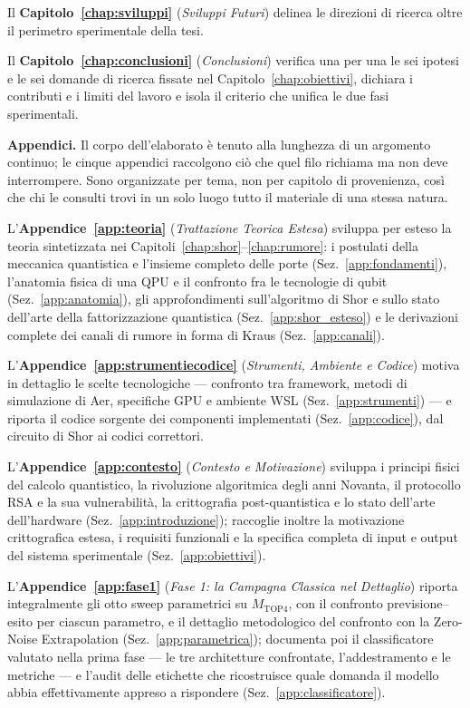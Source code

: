 \begin{onehalfspace}
Il \textbf{Capitolo~\ref{chap:sviluppi}} (\textit{Sviluppi Futuri}) delinea le direzioni di ricerca oltre il perimetro sperimentale della tesi.

Il \textbf{Capitolo~\ref{chap:conclusioni}} (\textit{Conclusioni}) verifica una per una le sei ipotesi e le sei domande di ricerca fissate nel Capitolo~\ref{chap:obiettivi}, dichiara i contributi e i limiti del lavoro e isola il criterio che unifica le due fasi sperimentali.

\medskip
\textbf{Appendici.} Il corpo dell'elaborato è tenuto alla lunghezza di un argomento continuo; le cinque appendici raccolgono ciò che quel filo richiama ma non deve interrompere. Sono organizzate per tema, non per capitolo di provenienza, così che chi le consulti trovi in un solo luogo tutto il materiale di una stessa natura.

L'\textbf{Appendice~\ref{app:teoria}} (\textit{Trattazione Teorica Estesa}) sviluppa per esteso la teoria sintetizzata nei Capitoli~\ref{chap:shor}--\ref{chap:rumore}: i postulati della meccanica quantistica e l'insieme completo delle porte (Sez.~\ref{app:fondamenti}), l'anatomia fisica di una \ac{QPU} e il confronto fra le tecnologie di qubit (Sez.~\ref{app:anatomia}), gli approfondimenti sull'algoritmo di Shor e sullo stato dell'arte della fattorizzazione quantistica (Sez.~\ref{app:shor_esteso}) e le derivazioni complete dei canali di rumore in forma di Kraus (Sez.~\ref{app:canali}).

L'\textbf{Appendice~\ref{app:strumentiecodice}} (\textit{Strumenti, Ambiente e Codice}) motiva in dettaglio le scelte tecnologiche --- confronto tra framework, metodi di simulazione di Aer, specifiche GPU e ambiente WSL (Sez.~\ref{app:strumenti}) --- e riporta il codice sorgente dei componenti implementati (Sez.~\ref{app:codice}), dal circuito di Shor ai codici correttori.

L'\textbf{Appendice~\ref{app:contesto}} (\textit{Contesto e Motivazione}) sviluppa i principi fisici del calcolo quantistico, la rivoluzione algoritmica degli anni Novanta, il protocollo RSA e la sua vulnerabilità, la crittografia post-quantistica e lo stato dell'arte dell'hardware (Sez.~\ref{app:introduzione}); raccoglie inoltre la motivazione crittografica estesa, i requisiti funzionali e la specifica completa di input e output del sistema sperimentale (Sez.~\ref{app:obiettivi}).

L'\textbf{Appendice~\ref{app:fase1}} (\textit{Fase 1: la Campagna Classica nel Dettaglio}) riporta integralmente gli otto sweep parametrici su $M_{\text{TOP4}}$, con il confronto previsione--esito per ciascun parametro, e il dettaglio metodologico del confronto con la Zero-Noise Extrapolation (Sez.~\ref{app:parametrica}); documenta poi il classificatore valutato nella prima fase --- le tre architetture confrontate, l'addestramento e le metriche --- e l'audit delle etichette che ricostruisce quale domanda il modello abbia effettivamente appreso a rispondere (Sez.~\ref{app:classificatore}).


\end{onehalfspace}
